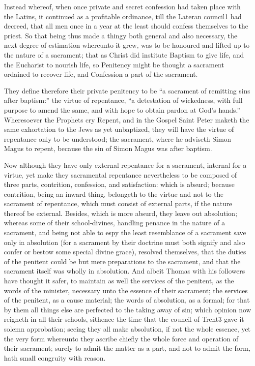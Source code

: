 Instead whereof, when once private and secret confession had taken place with the Latins, it continued as a profitable ordinance, till the Lateran council1 had decreed, that all men once in a year at the least should confess themselves to the priest. So that being thus made a thingy both general and also necessary, the next degree of estimation whereunto it grew, was to be honoured and lifted up to the nature of a sacrament; that as Christ did institute Baptism to give life, and the Eucharist to nourish life, so Penitency might be thought a sacrament ordained to recover life, and Confession a part of the sacrament.

They define therefore their private penitency to be “a sacrament of remitting sins after baptism:” the virtue of repentance, “a detestation of wickedness, with full purpose to amend the same, and with hope to obtain pardon at God’s hands.” Wheresoever the Prophets cry Repent, and in the Gospel Saint Peter maketh the same exhortation to the Jews as yet unbaptized, they will have the virtue of repentance only to be understood; the sacrament, where he adviseth Simon Magus to repent, because the sin of Simon Magus was after baptism.

Now although they have only external repentance for a sacrament, internal for a virtue, yet make they sacramental repentance nevertheless to be composed of three parts, contrition, confession, and satisfaction: which is absurd; because contrition, being an inward thing, belongeth to the virtue and not to the sacrament of repentance, which must consist of external parts, if the nature thereof be external. Besides, which is more absurd, they leave out absolution; whereas some of their school-divines, handling penance in the nature of a sacrament, and being not able to espy the least resemblance of a sacrament save only in absolution (for a sacrament by their doctrine must both signify and also confer or bestow some special divine grace), resolved themselves, that the duties of the penitent could be but mere preparations to the sacrament, and that the sacrament itself was wholly in absolution. And albeit Thomas with his followers have thought it safer, to maintain as well the services of the penitent, as the words of the minister, necessary unto the essence of their sacrament; the services of the penitent, as a cause material; the words of absolution, as a formal; for that by them all things else are perfected to the taking away of sin; which opinion now reigneth in all their schools, sithence the time that the council of Trent3 gave it solemn approbation; seeing they all make absolution, if not the whole essence, yet the very form whereunto they ascribe chiefly the whole force and operation of their sacrament; surely to admit the matter as a part, and not to admit the form, hath small congruity with reason.

